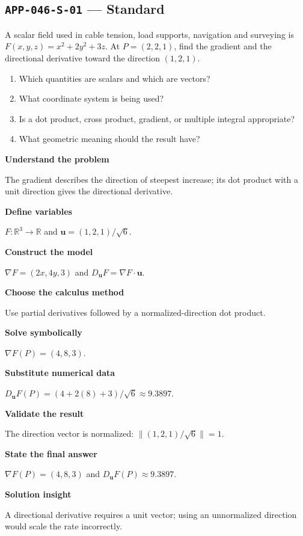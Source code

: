 \documentclass[11pt]{book}
\newcommand{\pid}[1]{\texttt{#1}}
\begin{document}
\subsection*{\pid{APP-046-S-01} — Standard}
\begin{problembox}
A scalar field used in cable tension, load supports, navigation and surveying is $F(x,y,z)=x^2+2y^2+3z$. At $P=(2,2,1)$, find the gradient and the directional derivative toward the direction $(1,2,1)$.
\end{problembox}
\begin{promptbox}\begin{enumerate}
\item Which quantities are scalars and which are vectors?
\item What coordinate system is being used?
\item Is a dot product, cross product, gradient, or multiple integral appropriate?
\item What geometric meaning should the result have?
\end{enumerate}\end{promptbox}
\begin{solutionbox}
\textbf{Understand the problem}\par The gradient describes the direction of steepest increase; its dot product with a unit direction gives the directional derivative.\par\medskip
\textbf{Define variables}\par $F:\mathbb R^3\to\mathbb R$ and $\mathbf u=(1,2,1)/\sqrt6$.\par\medskip
\textbf{Construct the model}\par $\nabla F=(2x,4y,3)$ and $D_{\mathbf u}F=\nabla F\cdot\mathbf u$.\par\medskip
\textbf{Choose the calculus method}\par Use partial derivatives followed by a normalized-direction dot product.\par\medskip
\textbf{Solve symbolically}\par $\nabla F(P)=(4,8,3)$.\par\medskip
\textbf{Substitute numerical data}\par $D_{\mathbf u}F(P)=(4+2(8)+3)/\sqrt6\approx 9.3897$.\par\medskip
\textbf{Validate the result}\par The direction vector is normalized: $\|(1,2,1)/\sqrt6\|=1$.\par\medskip
\textbf{State the final answer}\par $\nabla F(P)=(4,8,3)$ and $D_{\mathbf u}F(P)\approx 9.3897$.\par\medskip
\textbf{Solution insight}\par A directional derivative requires a unit vector; using an unnormalized direction would scale the rate incorrectly.\par\medskip
\end{solutionbox}
\end{document}
